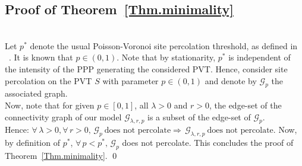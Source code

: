 \documentclass[10pt,a4paper]{amsart}
\theoremstyle{exampstyle}
\theoremstyle{exampnotations}
\begin{document}
\subsection{Proof of Theorem~\ref{Thm.minimality}}\mbox{}\\
\indent Let $p^*$ denote the usual Poisson-Voronoi site percolation threshold, as defined in ~\cite{becker_percolation_2009,neher2008topological}. It is known that $p \in \left(0,1\right)$. Note that by stationarity, $p^*$ is independent of the intensity of the PPP generating the considered PVT. Hence, consider site percolation on the PVT $S$ with parameter $p \in \left(0,1\right)$ and denote by $\mathcal{G}_p$ the associated graph. \\
Now, note that for given $p \in \left[0,1\right]$, all $\lambda >0$ and $r>0$, the edge-set of the connectivity graph of our model $\mathcal{G}_{\lambda,r,p}$ is a subset of the edge-set of $\mathcal{G}_p$. 
\\Hence: $\forall \, \lambda >0, \forall \, r>0, \, \mathcal{G}_{p} \ \text{does not percolate} \Rightarrow \, \mathcal{G}_{\lambda, r, p} \ \text{does not percolate}$.
Now, by definition of $p^*$, $\forall \, p < p^*, \, \mathcal{G}_p$ does not percolate. This concludes the proof of Theorem~\ref{Thm.minimality}. \qed
\\
\end{document}
